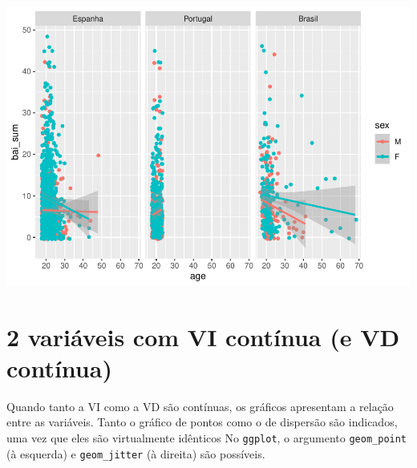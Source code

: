 \documentclass[
]{book}
\newenvironment{Shaded}{\begin{snugshade}}{\end{snugshade}}
\newcommand{\CommentTok}[1]{\textcolor[rgb]{0.56,0.35,0.01}{\textit{#1}}}
\newcommand{\DataTypeTok}[1]{\textcolor[rgb]{0.13,0.29,0.53}{#1}}
\newcommand{\DecValTok}[1]{\textcolor[rgb]{0.00,0.00,0.81}{#1}}
\newcommand{\KeywordTok}[1]{\textcolor[rgb]{0.13,0.29,0.53}{\textbf{#1}}}
\newcommand{\NormalTok}[1]{#1}
\newcommand{\OperatorTok}[1]{\textcolor[rgb]{0.81,0.36,0.00}{\textbf{#1}}}
\newcommand{\StringTok}[1]{\textcolor[rgb]{0.31,0.60,0.02}{#1}}
\begin{document}
\begin{center}\includegraphics{gitbook-demo_files/figure-latex/unnamed-chunk-28-1} \end{center}

\hypertarget{variuxe1veis-com-vi-contuxednua-e-vd-contuxednua}{%
\section{2 variáveis com VI contínua (e VD
contínua)}\label{variuxe1veis-com-vi-contuxednua-e-vd-contuxednua}}

Quando tanto a VI como a VD são contínuas, os gráficos apresentam a
relação entre as variáveis. Tanto o gráfico de pontos como o de
dispersão são indicados, uma vez que eles são virtualmente idênticos No
\texttt{ggplot}, o argumento \texttt{geom\_point} (à esquerda) e
\texttt{geom\_jitter} (à direita) são possíveis.

\begin{Shaded}
\end{Shaded}
\end{document}

